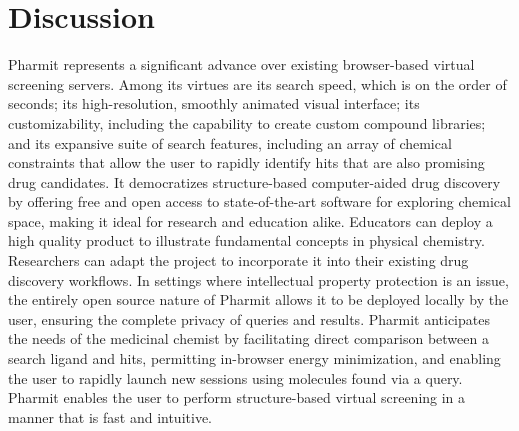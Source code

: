 \section{Discussion}
Pharmit represents a significant advance over existing browser-based virtual screening servers. Among its virtues are its search speed, which is on the order of seconds; its high-resolution, smoothly animated visual interface; its customizability, including the capability to create custom compound libraries; and its expansive suite of search features, including an array of chemical constraints that allow the user to rapidly identify hits that are also promising drug candidates. It democratizes structure-based computer-aided drug discovery by offering free and open access to state-of-the-art software for exploring chemical space, making it ideal for research and education alike. Educators can deploy a high quality product to illustrate fundamental concepts in physical chemistry. Researchers can adapt the project to incorporate it into their existing drug discovery workflows. In settings where intellectual property protection is an issue, the entirely open source nature of Pharmit allows it to be deployed locally by the user, ensuring the complete privacy of queries and results.  Pharmit anticipates the needs of the medicinal chemist by facilitating direct comparison between a search ligand and hits, permitting in-browser energy minimization, and enabling the user to rapidly launch new sessions using molecules found via a query. Pharmit enables the user to perform structure-based virtual screening in a manner that is fast and intuitive. 


